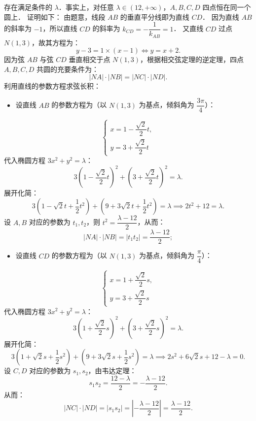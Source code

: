 \begin{answer}
存在满足条件的 $\lambda$．事实上，对任意 $\lambda \in (12, +\infty)$，$A, B, C, D$ 四点恒在同一个圆上．
证明如下：
由题意，线段 $AB$ 的垂直平分线即为直线 $CD$．
因为直线 $AB$ 的斜率为 $-1$，所以直线 $CD$ 的斜率为 $k_{CD} = -\dfrac{1}{k_{AB}} = 1$．
又直线 $CD$ 过点 $N(1, 3)$，故其方程为：
\nopagebreak[4]
\[
y - 3 = 1 \times (x - 1) \iff y = x + 2.
\]
因为弦 $AB$ 与弦 $CD$ 垂直相交于点 $N(1, 3)$，根据相交弦定理的逆定理，四点 $A, B, C, D$ 共圆的充要条件为：
\nopagebreak[4]
\[
|NA| \cdot |NB| = |NC| \cdot |ND|.
\]
利用直线的参数方程求弦长积：
\begin{itemize}
\item 设直线 $AB$ 的参数方程为（以 $N(1, 3)$ 为基点，倾斜角为 $\dfrac{3\pi}{4}$）：
\end{itemize}
\nopagebreak[4]
\[
\begin{cases}
x = 1 - \dfrac{\sqrt{2}}{2}t, \\
y = 3 + \dfrac{\sqrt{2}}{2}t
\end{cases}
\]
  代入椭圆方程 $3x^2 + y^2 = \lambda$：
\nopagebreak[4]
\[
3\left(1 - \frac{\sqrt{2}}{2}t\right)^2 + \left(3 + \frac{\sqrt{2}}{2}t\right)^2 = \lambda.
\]
  展开化简：
\nopagebreak[4]
\[
3\left(1 - \sqrt{2}t + \frac{1}{2}t^2\right) + \left(9 + 3\sqrt{2}t + \frac{1}{2}t^2\right) = \lambda \implies 2t^2 + 12 = \lambda.
\]
  设 $A, B$ 对应的参数为 $t_1, t_2$，则 $t^2 = \dfrac{\lambda - 12}{2}$，从而：
\nopagebreak[4]
\[
|NA| \cdot |NB| = |t_1 t_2| = \frac{\lambda - 12}{2};
\]
\begin{itemize}
\item 设直线 $CD$ 的参数方程为（以 $N(1, 3)$ 为基点，倾斜角为 $\dfrac{\pi}{4}$）：
\end{itemize}
\nopagebreak[4]
\[
\begin{cases}
x = 1 + \dfrac{\sqrt{2}}{2}s, \\
y = 3 + \dfrac{\sqrt{2}}{2}s
\end{cases}
\]
  代入椭圆方程 $3x^2 + y^2 = \lambda$：
\nopagebreak[4]
\[
3\left(1 + \frac{\sqrt{2}}{2}s\right)^2 + \left(3 + \frac{\sqrt{2}}{2}s\right)^2 = \lambda.
\]
  展开化简：
\nopagebreak[4]
\[
3\left(1 + \sqrt{2}s + \frac{1}{2}s^2\right) + \left(9 + 3\sqrt{2}s + \frac{1}{2}s^2\right) = \lambda \implies 2s^2 + 6\sqrt{2}s + 12 - \lambda = 0.
\]
  设 $C, D$ 对应的参数为 $s_1, s_2$，由韦达定理：
\nopagebreak[4]
\[
s_1 s_2 = \frac{12 - \lambda}{2} = -\frac{\lambda - 12}{2}.
\]
  从而：
\nopagebreak[4]
\[
|NC| \cdot |ND| = |s_1 s_2| = \left|-\frac{\lambda - 12}{2}\right| = \frac{\lambda - 12}{2}.
\]


\end{answer}
